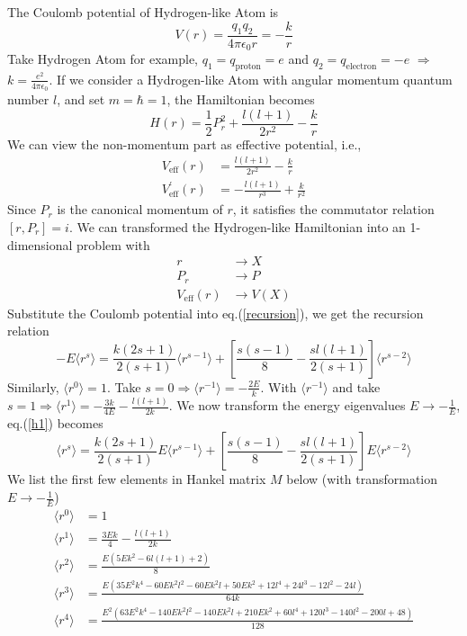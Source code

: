 \documentclass[10pt]{article}
\begin{document}
The Coulomb potential of Hydrogen-like Atom is
\begin{equation}
    V(r)=\frac{q_1q_2}{4\pi\epsilon_0 r}=-\frac{k}{r}
\end{equation}
Take Hydrogen Atom for example, $q_1=q_{\text{proton}}=e$ and $q_2=q_{\text{electron}}=-e$ $\Rightarrow$ $k=\frac{e^2}{4\pi\epsilon_0}$. If we consider a Hydrogen-like Atom with angular momentum quantum number $l$, and set $m=\hbar=1$, the Hamiltonian becomes
\begin{equation}
    H(r)=\frac{1}{2}P^2_r+\frac{l(l+1)}{2r^2}-\frac{k}{r}
\end{equation}
We can view the non-momentum part as effective potential, i.e.,
\begin{align}
V_{\text{eff}}(r)&=\frac{l(l+1)}{2r^2}-\frac{k}{r}\\
V^\prime_{\text{eff}}(r)&=-\frac{l(l+1)}{r^3}+\frac{k}{r^2}
\end{align}
Since $P_r$ is the canonical momentum of $r$, it satisfies the commutator  relation $[r,P_r]=i$. We can transformed the Hydrogen-like Hamiltonian into an 1-dimensional problem with
\begin{align*}
    r &\rightarrow X\\
    P_r &\rightarrow P\\
    V_{\text{eff}}(r) &\rightarrow V(X)
\end{align*}
Substitute the Coulomb potential into eq.(\ref{recursion}), we get the recursion relation
\begin{equation}\label{h1}
    -E\langle r^s\rangle = 
    \frac{k(2s+1)}{2(s+1)}\langle r^{s-1}\rangle
    +[\frac{s(s-1)}{8}-\frac{sl(l+1)}{2(s+1)}]\langle r^{s-2}\rangle
\end{equation}
Similarly, $\langle r^0\rangle=1$. Take $s=0\Rightarrow \langle r^{-1}\rangle=-\frac{2E}{k}$. With $\langle r^{-1}\rangle$ and take $s=1\Rightarrow \langle r^1\rangle=-\frac{3k}{4E}-\frac{l(l+1)}{2k}$. We now transform the energy eigenvalues $E\rightarrow-\frac{1}{E}$, eq.(\ref{h1}) becomes
\begin{equation}
    \langle r^s\rangle = 
    \frac{k(2s+1)}{2(s+1)}E\langle r^{s-1}\rangle
    +[\frac{s(s-1)}{8}-\frac{sl(l+1)}{2(s+1)}]E\langle r^{s-2}\rangle
\end{equation}
We list the first few elements in Hankel matrix $M$ below (with transformation $E\rightarrow -\frac{1}{E}$)
\begin{align*}
    \langle r^0\rangle &= 1\\
    \langle r^1\rangle &= \frac{3Ek}{4}-\frac{l\left(l+1\right)}{2k}\\
    \langle r^2\rangle &= \frac{E \left(5 E k^{2} - 6 l \left(l + 1\right) + 2\right)}{8}\\
    \langle r^3\rangle &= \frac{E \left(35 E^{2} k^{4} - 60 E k^{2} l^{2} - 60 E k^{2} l + 50 E k^{2} + 12 l^{4} + 24 l^{3} - 12 l^{2} - 24 l\right)}{64 k}\\
    \langle r^4\rangle &= \frac{E^{2} \left(63 E^{2} k^{4} - 140 E k^{2} l^{2} - 140 E k^{2} l + 210 E k^{2} + 60 l^{4} + 120 l^{3} - 140 l^{2} - 200 l + 48\right)}{128}\\
\end{align*}
\end{document}
